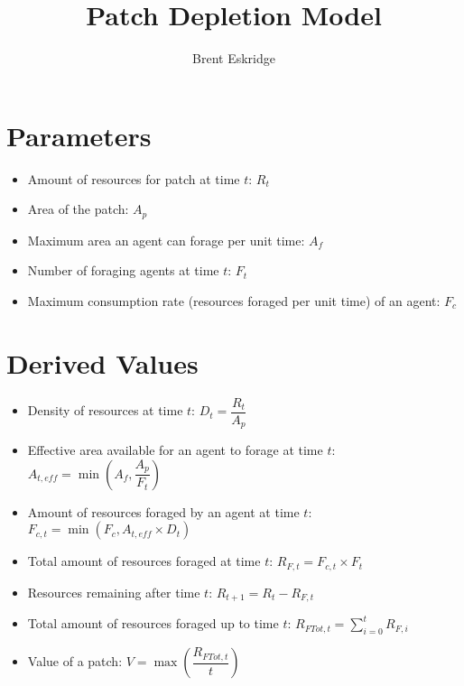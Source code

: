 \documentclass[letterpaper,12pt]{article}
\title{Patch Depletion Model}
\author{Brent Eskridge}
\begin{document}
\maketitle

\section{Parameters}

\begin{itemize}
 \item Amount of resources for patch at time $t$: $R_t$
 \item Area of the patch: $A_p$
 \item Maximum area an agent can forage per unit time: $A_f$
 \item Number of foraging agents at time $t$: $F_t$
 \item Maximum consumption rate (resources foraged per unit time) of an agent: $F_c$
\end{itemize}

\section{Derived Values}

\begin{itemize}
 \item Density of resources at time $t$: $D_t = \dfrac{R_t}{A_p}$
 \item Effective area available for an agent to forage at time $t$: $A_{t,eff} = \min\left({ A_f, \dfrac{A_p}{F_t} }\right)$
 \item Amount of resources foraged by an agent at time $t$: $F_{c,t} = \min({F_c, A_{t,eff} \times D_t})$
 \item Total amount of resources foraged at time $t$: $R_{F,t} = F_{c,t} \times F_t$
 \item Resources remaining after time $t$: $R_{t+1} = R_{t} - R_{F,t}$
 \item Total amount of resources foraged up to time $t$: $R_{FTot,t} = \sum_{i=0}^{t} R_{F,i}$
 \item Value of a patch: $V = \max\left({ \dfrac{R_{FTot,t}}{t} }\right)$
\end{itemize}




\end{document}
